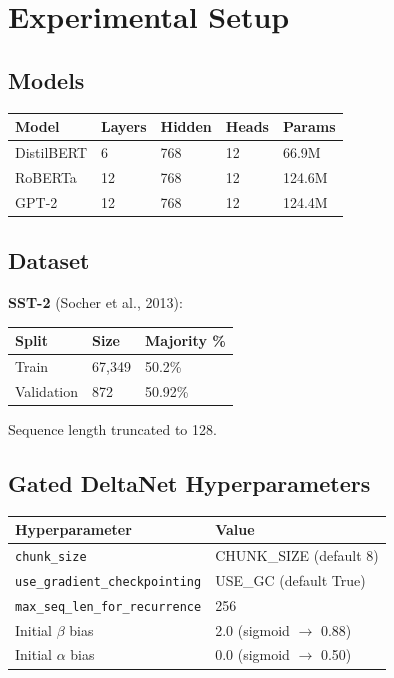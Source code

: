 
\section{Experimental Setup}

\subsection{Models}

\begin{table}[H]
\centering
\small
\begin{tabular}{lllll}
\toprule
\textbf{Model} & \textbf{Layers} & \textbf{Hidden} & \textbf{Heads} & \textbf{Params} \\
\midrule
DistilBERT & 6 & 768 & 12 & 66.9M \\
RoBERTa & 12 & 768 & 12 & 124.6M \\
GPT-2 & 12 & 768 & 12 & 124.4M \\
\bottomrule
\end{tabular}
\end{table}

\subsection{Dataset}

\textbf{SST-2} (Socher et al., 2013):

\begin{table}[H]
\centering
\small
\begin{tabular}{lll}
\toprule
\textbf{Split} & \textbf{Size} & \textbf{Majority \%} \\
\midrule
Train & 67,349 & 50.2\% \\
Validation & 872 & 50.92\% \\
\bottomrule
\end{tabular}
\end{table}

Sequence length truncated to 128.

\subsection{Gated DeltaNet Hyperparameters}

\begin{table}[H]
\centering
\small
\begin{tabular}{ll}
\toprule
\textbf{Hyperparameter} & \textbf{Value} \\
\midrule
\texttt{chunk\_size} & {{CHUNK\_SIZE}} (default 8) \\
\texttt{use\_gradient\_checkpointing} & {{USE\_GC}} (default True) \\
\texttt{max\_seq\_len\_for\_recurrence} & 256 \\
Initial $\beta$ bias & 2.0 (sigmoid $\to$ 0.88) \\
Initial $\alpha$ bias & 0.0 (sigmoid $\to$ 0.50) \\
\bottomrule
\end{tabular}
\end{table}

